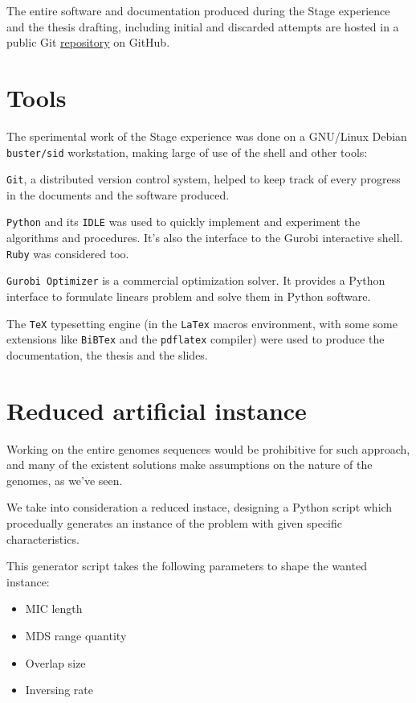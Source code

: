 The entire software and documentation produced during the Stage experience and the thesis drafting, including initial and discarded attempts are hosted in a public Git \href{https://github.com/avivace/dna-recombination}{repository} on GitHub.

\section{Tools}
The sperimental work of the Stage experience was done on a GNU/Linux Debian \texttt{buster/sid} workstation, making large of use of the shell and other tools:

\texttt{Git}, a distributed version control system, helped to keep track of every progress in the documents and the software produced.

\texttt{Python} \cite{Rossum:1995:PRM:869369} and its \texttt{IDLE} was used to quickly implement and experiment the algorithms and procedures. It's also the interface to the Gurobi interactive shell. \texttt{Ruby} was considered too.

\texttt{Gurobi Optimizer} \cite{gurobi} is a commercial optimization solver. It provides a Python interface to formulate linears problem and solve them in Python software.

The \texttt{TeX} typesetting engine (in the \texttt{LaTex} macros environment, with some some extensions like \texttt{BiBTex} and the \texttt{pdflatex} compiler) were used to produce the documentation, the thesis and the slides.

\section{Reduced artificial instance}
Working on the entire genomes sequences would be prohibitive for such approach, and many of the existent solutions make assumptions on the nature of the genomes, as we've seen.

We take into consideration a reduced instace, designing a Python script which procedually generates an instance of the problem with given specific characteristics.

This generator script takes the following parameters to shape the wanted instance:

\begin{itemize}
	\item MIC length
	\item MDS range quantity
	\item Overlap size
	\item Inversing rate
\end{itemize}

